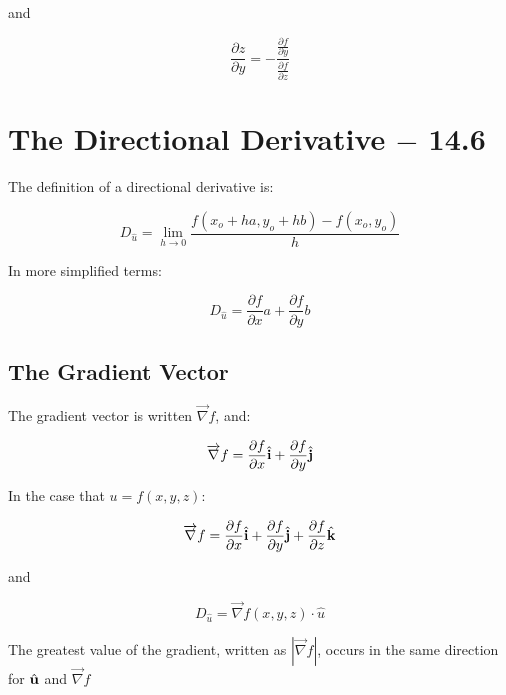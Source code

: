\documentclass[12pt]{article}
\begin{document}
and

$$\frac{\partial z}{\partial y}=-\frac{\frac{\partial f}{\partial y}}{\frac{\partial f}{\partial z}}$$

\section{The Directional Derivative $-$ 14.6}

The definition of a directional derivative is:

$$ D_{\hat{u}}=\lim_{h\to0} \frac{f(x_o+ha, y_o + hb)-f(x_o,y_o)}{h} $$

In more simplified terms:

$$D_{\hat{u}}=\frac{\partial f}{\partial x} a + \frac{\partial f}{\partial y} b$$

\subsection{The Gradient Vector}

The gradient vector is written $\overrightarrow{\nabla} f$, and:

$$\overrightarrow{\nabla} f = \frac{\partial f}{\partial x}\hat{\bold{i}} + \frac{\partial f}{\partial y}\hat{\bold{j}}$$

In the case that $u = f(x,y,z)$:

$$\overrightarrow{\nabla} f = \frac{\partial f}{\partial x}\hat{\bold{i}} + \frac{\partial f}{\partial y}\hat{\bold{j}}+\frac{\partial f}{\partial z}\hat{\bold{k}}$$

and

$$D_{\hat{u}}=\overrightarrow{\nabla}f(x,y,z)\cdot\hat{u}$$

The greatest value of the gradient, written as $|\overrightarrow{\nabla}f|$, occurs in the same direction for $\hat{\bold{u}}$ and $\overrightarrow{\nabla}f$
\end{document}
